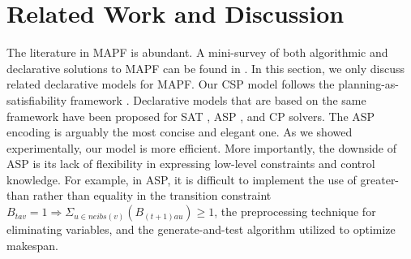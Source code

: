 \documentclass[conference]{IEEEtran}
\begin{document}
\section{Related Work and Discussion}
The literature in MAPF is abundant. A mini-survey of both algorithmic and declarative solutions to MAPF can be found in \cite{SharonSGF13}. In this section, we only discuss related declarative models for MAPF.
Our CSP model follows the planning-as-satisfiability framework \cite{HuangCZ10,KautzS92,Rintanen12}. Declarative models that are based on the same framework have been proposed for SAT \cite{Surynek14}, ASP \cite{ErdemKOS13}, and CP \cite{Ryan10} solvers. The ASP encoding is arguably the most concise and elegant one. As we showed experimentally, our model is more efficient. More importantly, the downside of ASP is its lack of flexibility in expressing low-level constraints and control knowledge. For example, in ASP, it is difficult to implement the use of greater-than rather than equality in the transition constraint $B_{t a v} = 1 \Rightarrow \Sigma_{u \in neibs(v)}(B_{(t+1) a u}) \ge 1$, the preprocessing technique for eliminating variables, and the generate-and-test algorithm utilized to optimize makespan.
\end{document}
